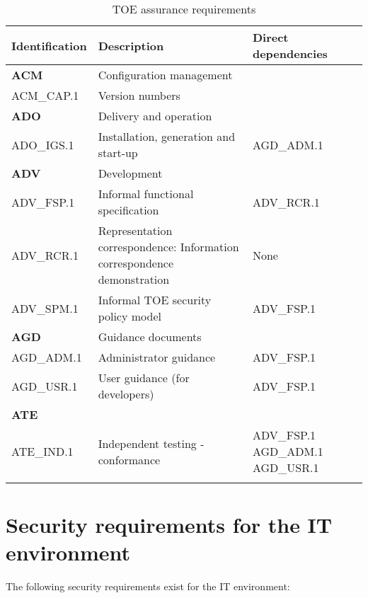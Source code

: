 \documentclass[12pt,english]{scrbook}
\begin{document}
\begin{longtable}[c]{lp{7cm}p{3cm}}
  \toprule
  Identification & Description & Direct dependencies\\
  \midrule \endhead

  \textbf{ACM} & Configuration management &  \\
  ACM{\_}CAP.1 & Version numbers \\

  \textbf{ADO} & Delivery and operation &  \\
  ADO{\_}IGS.1 & Installation, generation and start-up & AGD{\_}ADM.1 \\
  
  \textbf{ADV} & Development &  \\
  ADV{\_}FSP.1 & Informal functional specification & ADV{\_}RCR.1 \\

  ADV{\_}RCR.1 & Representation correspondence: Information correspondence
  demonstration & None \\

  ADV{\_}SPM.1 & Informal TOE security policy model & ADV\_FSP.1 \\

  \textbf{AGD} & Guidance documents &  \\
  AGD{\_}ADM.1 & Administrator guidance & ADV{\_}FSP.1 \\
  AGD{\_}USR.1 & User guidance (for developers) & ADV{\_}FSP.1 \\
  \textbf{ATE} &  &  \\ 
  ATE{\_}IND.1 & Independent testing - conformance & ADV{\_}FSP.1 AGD{\_}ADM.1 AGD{\_}USR.1 \\


  \bottomrule
  \caption{TOE assurance requirements}

\end{longtable}





\section{Security requirements for the IT environment}

The following security requirements exist for the IT environment:
\end{document}

